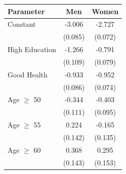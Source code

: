 \begin{tabular}{lcc}
    \toprule
    Parameter & Men & Women \\
    \midrule
    Constant & -3.006 & -2.727 \\
     & (0.085) & (0.072) \\
    High Education & -1.266 & -0.791 \\
     & (0.109) & (0.079) \\
    Good Health & -0.933 & -0.952 \\
     & (0.086) & (0.074) \\
    Age $\geq$ 50 & -0.344 & -0.403 \\
     & (0.111) & (0.095) \\
    Age $\geq$ 55 & 0.224 & -0.165 \\
     & (0.142) & (0.135) \\
    Age $\geq$ 60 & 0.368 & 0.295 \\
     & (0.143) & (0.153) \\
    \bottomrule
\end{tabular}
